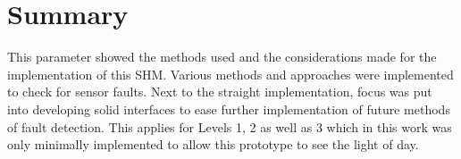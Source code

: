 \newpage
\section{Summary}

This parameter showed the methods used and the considerations made for the implementation of this SHM. Various methods and approaches were implemented to check for sensor faults. Next to the straight implementation, focus was put into developing solid interfaces to ease further implementation of future methods of fault detection. This applies for Levels 1, 2 as well as 3 which in this work was only minimally implemented to allow this prototype to see the light of day.





